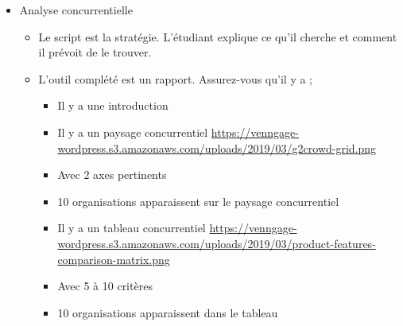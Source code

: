 \begin{itemize}
\item Analyse concurrentielle
\begin{itemize}
\item Le script est la stratégie. L'étudiant explique ce qu'il cherche et comment il prévoit de le trouver.
\item L'outil complété est un rapport. Assurez-vous qu'il y a ;
\begin{itemize}
\item Il y a une introduction
\item Il y a un paysage concurrentiel \url{https://venngage-wordpress.s3.amazonaws.com/uploads/2019/03/g2crowd-grid.png}
\item Avec 2 axes pertinents
\item 10 organisations apparaissent sur le paysage concurrentiel
\item Il y a un tableau concurrentiel \url{https://venngage-wordpress.s3.amazonaws.com/uploads/2019/03/product-features-comparison-matrix.png}
\item Avec 5 à 10 critères
\item 10 organisations apparaissent dans le tableau
\end{itemize}
\end{itemize}
\end{itemize}

